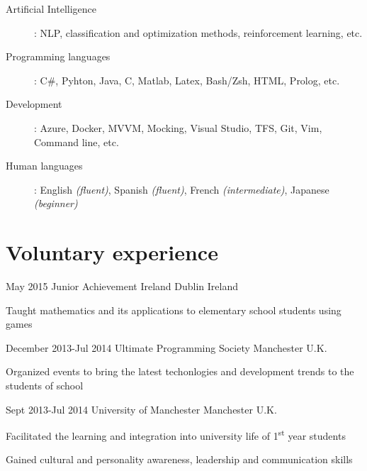 \documentclass{CurriculumVitae}
\begin{document}
    \begin{description}
       \item[Artificial Intelligence]: NLP, classification and optimization methods, reinforcement learning, etc.
       \item[Programming languages]: C\#, Pyhton, Java, C, Matlab, Latex, Bash/Zsh, HTML, Prolog, etc.
       \item[Development]: Azure, Docker, MVVM, Mocking, Visual Studio, TFS, Git, Vim, Command line, etc.
       \item[Human languages]: English \emph{(fluent)}, Spanish \emph{(fluent)}, French \emph{(intermediate)}, Japanese \emph{(beginner)}
    \end{description}


  \section{Voluntary experience}
     
      {May 2015}
      {Junior Achievement Ireland}
      {Dublin}
      {Ireland}
      {
         \item Taught mathematics and its applications to elementary school students using games
      }

      {December 2013-Jul 2014}
      {Ultimate Programming Society}
      {Manchester}
      {U.K.}
      {
         \item Organized events to bring the latest techonlogies and development trends to the students of school
      }

      {Sept 2013-Jul 2014}
      {University of Manchester}
      {Manchester}
      {U.K.}
      {
         \item Facilitated the learning and integration into university life of 1\textsuperscript{st} year students
         \item Gained cultural and personality awareness, leadership and communication skills
      }
\end{document}
